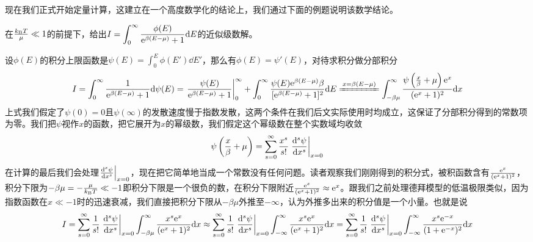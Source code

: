 \documentclass[../../main.tex]{subfiles}
\begin{document}
现在我们正式开始定量计算，这建立在一个高度数学化的结论上，我们通过下面的例题说明该数学结论。
\begin{example}
    在\(\frac{k_{\mathrm{B}} T}{\mu}\ll 1\)的前提下，给出\(\displaystyle I=\int_0^{\infty}\frac{\phi(E)}{\mathrm{e}^{\beta(E-\mu)}+1}\dd E\)的近似级数解。
    \begin{solution}
        设\(\phi(E)\)的积分上限函数是\(\psi(E)=\int_0^{E}\phi(E')\dd E'\)，那么有\(\phi(E)=\psi'(E)\)，对待求积分做分部积分
        \begin{equation}
            I=\int_0^{\infty}\frac{1}{\e^{\beta(E-\mu)}+1}\dd \psi(E)=\eval{\frac{\psi(E)}{\e^{\beta(E-\mu)}+1}}_{0}^{\infty}+\int_0^{\infty}\frac{\psi(E)\e^{\beta(E-\mu)}\beta}{[\e^{\beta(E-\mu)}+1]^2}\dd E\xlongequal{x=\beta(E-\mu)}\int_{-\beta\mu}^{\infty}\frac{\psi\left(\frac{x}{\beta}+\mu\right)\e^x}{(\e^x+1)^2}\dd x
        \end{equation}
        上式我们假定了\(\psi(0)=0\)且\(\psi(\infty)\)的发散速度慢于指数发散，这两个条件在我们后文实际使用时均成立，这保证了分部积分得到的常数项为零。我们把\(\psi\)视作\(x\)的函数，把它展开为\(x\)的幂级数，我们假定这个幂级数在整个实数域均收敛
        \begin{equation}
            \psi\left(\frac{x}{\beta}+\mu\right)=\sum_{s=0}^{\infty}\frac{x^s}{s!}\eval{\dv[s]{\psi}{x}}_{x=0}
        \end{equation}
        在计算的最后我们会处理\(\eval{\dv[s]{\psi}{x}}_{x=0}\)，现在把它简单地当成一个常数没有任何问题。读者观察我们刚刚得到的积分式，被积函数含有\(\frac{\mathrm{e}^x}{(\mathrm{e}^x+1)^2}\)，积分下限为\(-\beta\mu=-\frac{\mu}{k_{\mathrm{B}} T}\ll -1\)即积分下限是一个很负的数，在积分下限附近\(\frac{\mathrm{e}^x}{(\mathrm{e}^x+1)^2}\approx \mathrm{e}^x\)。跟我们之前处理德拜模型的低温极限类似，因为指数函数在\(x\ll -1\)时的迅速衰减，我们直接把积分下限从\(-\beta\mu\)外推至\(-\infty\)，认为外推多出来的积分值是一个小量。也就是说
        \begin{equation}
            I=\sum_{s=0}^{\infty}\frac{1}{s!}\eval{\dv[s]{\psi}{x}}_{x=0}\int_{-\beta\mu}^{\infty}\frac{x^s\e^x}{(\e^x+1)^2}\dd x\approx \sum_{s=0}^{\infty}\frac{1}{s!}\eval{\dv[s]{\psi}{x}}_{x=0}\int_{-\infty}^{\infty}\frac{x^s\e^x}{(\e^x+1)^2}\dd x=\sum_{s=0}^{\infty}\frac{1}{s!}\eval{\dv[s]{\psi}{x}}_{x=0}\int_{-\infty}^{\infty}\frac{x^s\e^{-x}}{(1+\e^{-x})^2}\dd x
        \end{equation}


\end{solution}
\end{example}
\end{document}

